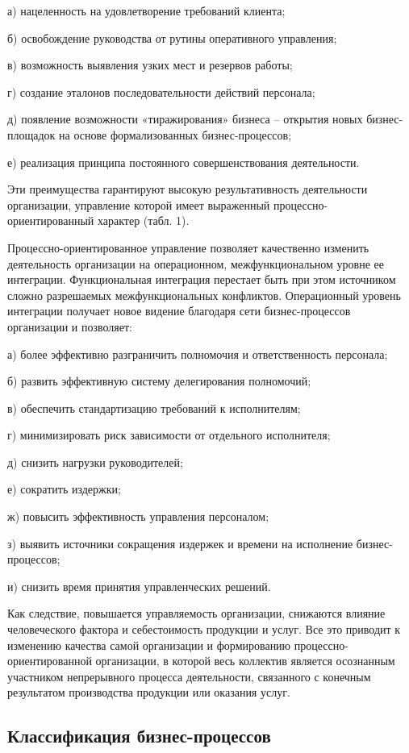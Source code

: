 \documentclass{../industrial-development}
\begin{document}
а) нацеленность на удовлетворение требований клиента;

б) освобождение руководства от рутины оперативного управления;

в) возможность выявления узких мест и резервов работы;

г) создание эталонов последовательности действий персонала;

д) появление возможности «тиражирования» бизнеса – открытия новых бизнес-площадок на основе формализованных бизнес-процессов;

е) реализация принципа постоянного совершенствования деятельности.

Эти преимущества гарантируют высокую результативность деятельности организации, управление которой имеет выраженный процессно-ориентированный характер (табл. 1).

Процессно-ориентированное управление позволяет качественно изменить деятельность организации на операционном, межфункциональном уровне ее интеграции. Функциональная интеграция перестает быть при этом источником сложно разрешаемых межфункциональных конфликтов. Операционный уровень интеграции получает новое видение благодаря сети бизнес-процессов организации и позволяет:

а) более эффективно разграничить полномочия и ответственность персонала;

б) развить эффективную систему делегирования полномочий;

в) обеспечить стандартизацию требований к исполнителям;

г) минимизировать риск зависимости от отдельного исполнителя;

д) снизить нагрузки руководителей;

е) сократить издержки;

ж) повысить эффективность управления персоналом;

з) выявить источники сокращения издержек и времени на исполнение бизнес-процессов;

и) снизить время принятия управленческих решений.

Как следствие, повышается управляемость организации, снижаются влияние человеческого фактора и себестоимость продукции и услуг. Все это приводит к изменению качества самой организации и формированию процессно-ориентированной организации, в которой весь коллектив является осознанным участником непрерывного процесса деятельности, связанного с конечным результатом производства продукции или оказания услуг.

\subsection{Классификация бизнес-процессов}
\end{document}
